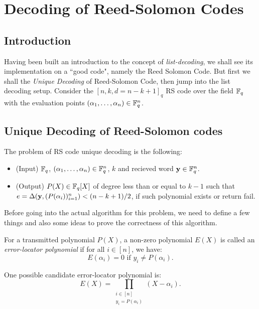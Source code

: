 \chapter{Decoding of Reed-Solomon Codes}

\section{Introduction}

Having been built an introduction to the concept of \emph{list-decoding}, we shall see its implementation on a ``good code", namely the Reed Solomon Code. But first we shall the \emph{Unique Decoding} of Reed-Solomon Code, then jump into the list decoding setup. Consider the $[n,k,d=n-k+1]_q$ RS code over the field $\mathbb{F}_q$ with the evaluation points $(\alpha_1,\ldots,\alpha_n)\in\mathbb{F}_q^n$.

\section{Unique Decoding of Reed-Solomon codes}
The problem of RS code unique decoding is the following:

\noindent
\begin{problem}
	\noindent
 \begin{itemize}
 	\item(Input) $\mathbb{F}_q$, $(\alpha_1,\ldots,\alpha_n)\in\mathbb{F}_q^n$, $k$ and recieved word $\mathbf{y}\in\mathbb{F}_q^n$.
 	\item(Output) $P(X)\in\mathbb{F}_q[X]$ of degree less than or equal to $k-1$ such that $e = \Delta(\mathbf{y}, (P(\alpha_i))_{i=1}^n)<(n-k+1)/2$, if such polynomial exists or return fail.
 \end{itemize}
\end{problem}

Before going into the actual algorithm for this problem, we need to define a few things and also some ideas to prove the correctness of this algorithm.

\begin{definition}
	For a transmitted polynomial $P(X)$, a non-zero polynomial $E(X)$ is called an \emph{error-locator polynomial} if for all $i\in[n]$, we have:
	\[
	E(\alpha_i) = 0 \text{ if } y_i \neq P(\alpha_i).
	\]
\end{definition}
One possible candidate error-locator polynomial is:
\[
E(X) = \prod_{\substack{i\in[n] \\ y_i = P(\alpha_i)}} (X-\alpha_i). 
\]

